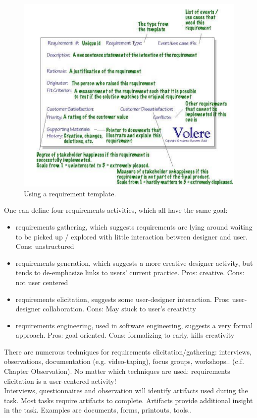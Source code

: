 \begin{figure}[h!]
	\centering
	\includegraphics[width=.8\textwidth]{img/ch06_req.png}
	\caption{Using a requirement template.}
	\label{req}
\end{figure}
One can define four requirements activities, which all have the same goal:
\begin{itemize}
\item requirements gathering, which suggests requirements are lying around waiting to be picked up / explored with little interaction between designer and user. Cons: unstructured
\item requirements generation, which suggests a more creative designer activity, but tends to de-emphasize links to users' current practice.
Pros: creative. Cons: not user centered
\item requirements elicitation, suggests some user-designer interaction. Pros: user-designer collaboration. Cons: May stuck to user's creativity
\item requirements engineering, used in software engineering, suggests a very formal approach. Pros: goal oriented. Cons: formalizing to early, kills creativity
\end{itemize}
There are numerous techniques for requirements elicitation/gathering: interviews, observations, documentation (e.g. video-taping), focus groups, workshops.. (c.f. Chapter Observation). No matter which techniques are used: requirements elicitation is a user-centered activity!\\
Interviews, questionnaires and observation will identify artifacts used during the task. Most tasks require artifacts to complete. Artifacts provide additional insight in the task. Examples are documents, forms, printouts, tools..

